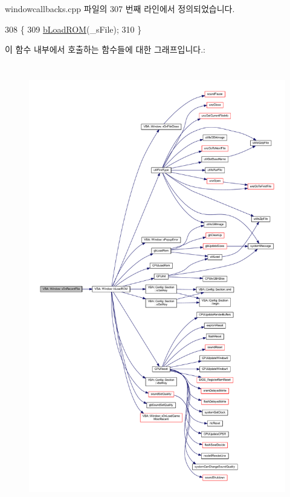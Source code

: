 windowcallbacks.\+cpp 파일의 307 번째 라인에서 정의되었습니다.


\begin{DoxyCode}
308 \{
309   \mbox{\hyperlink{class_v_b_a_1_1_window_a69ddb41bd29d9f0db04175671ff2e2f4}{bLoadROM}}(\_sFile);
310 \}
\end{DoxyCode}
이 함수 내부에서 호출하는 함수들에 대한 그래프입니다.\+:
\nopagebreak
\begin{figure}[H]
\begin{center}
\leavevmode
\includegraphics[height=550pt]{class_v_b_a_1_1_window_ab96850739fb7f53a370e6b6f059b87a9_cgraph}
\end{center}
\end{figure}
\mbox{\label{class_v_b_a_1_1_window_aed773f053d4ab731d5a555dc940c0195}} 
